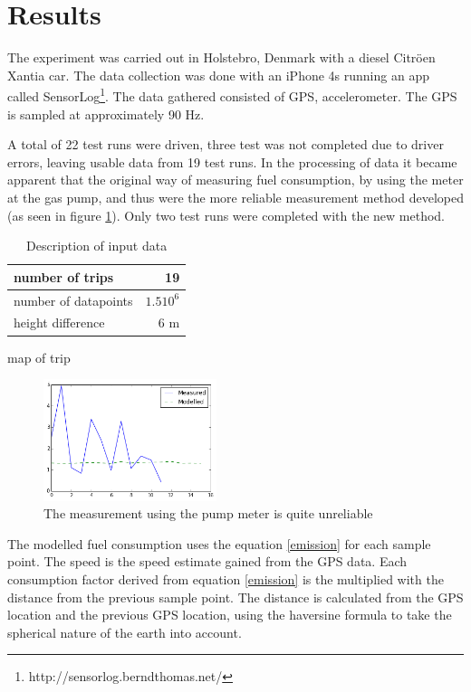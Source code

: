 \documentclass[conference]{IEEEtran}
\begin{document}
 \section{Results}
\label{sec:results}

The experiment was carried out in Holstebro, Denmark with a diesel Citr\"oen Xantia car. The data collection was done with an iPhone 4s running an app called SensorLog\footnote{http://sensorlog.berndthomas.net/}. The data gathered consisted of GPS, accelerometer. The GPS is sampled at approximately 90 Hz.

A total of 22 test runs were driven, three test was not completed due to driver errors, leaving
usable data from 19 test runs. In the processing of data it became apparent that the original way of measuring fuel consumption, by using the meter at the gas pump, and thus were the more reliable measurement method developed (as seen in figure \ref{measured}). Only two test runs were completed with the new method.

\begin{table}
\begin{tabular}{| l | r |}
\hline 
number of trips & 19 \\[0.1cm] \hline
number of datapoints & $1.5 10^6$\\[0.1cm] \hline
height difference & 6 m\\[0.1cm]
\hline 

\end{tabular}
\label{datatable}
\caption{Description of input data}
\end{table}
map of trip

\begin{figure}[h]
	\centering
	\includegraphics[width=0.45\textwidth]{Measured_consumption}
  \caption{The measurement using the pump meter is quite unreliable}
  \label{measured}
\end{figure}

The modelled fuel consumption uses the equation \ref{emission} for each sample point. The speed is the speed estimate gained from the GPS data. Each consumption factor derived from  equation \ref{emission} is the multiplied with the distance from the previous sample point. The distance is calculated from the GPS location and the previous GPS location, using the haversine formula \cite{rick1999deriving} to take the spherical nature of the earth into account.
\end{document}
